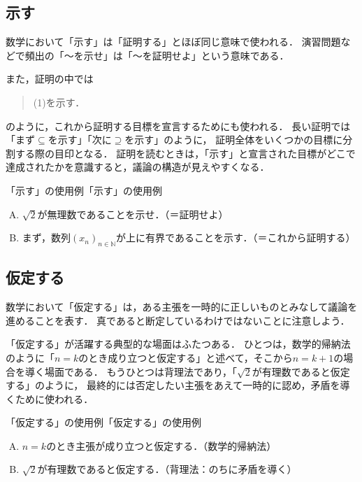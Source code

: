 \subsection{示す}

数学において「示す」は「証明する」とほぼ同じ意味で使われる．
演習問題などで頻出の「〜を示せ」は「〜を証明せよ」という意味である．

また，証明の中では
\begin{quote}
  (1)を示す．
\end{quote}
のように，これから証明する目標を宣言するためにも使われる．
長い証明では「まず$\subseteq$を示す」「次に$\supseteq$を示す」のように，
証明全体をいくつかの目標に分割する際の目印となる．
証明を読むときは，「示す」と宣言された目標がどこで達成されたかを意識すると，議論の構造が見えやすくなる．

\begin{example}{「示す」の使用例}{「示す」の使用例}
  \begin{enumerate}[(A)]
    \item $\sqrt{2}$が無理数であることを示せ．（＝証明せよ）
    \item まず，数列$(x_n)_{n \in \mathbb{N}}$が上に有界であることを示す．（＝これから証明する）
  \end{enumerate}
\end{example}

\subsection{仮定する}

数学において「仮定する」は，ある主張を一時的に正しいものとみなして議論を進めることを表す．
真であると断定しているわけではないことに注意しよう．

「仮定する」が活躍する典型的な場面はふたつある．
ひとつは，数学的帰納法のように「$n=k$のとき成り立つと仮定する」と述べて，そこから$n=k+1$の場合を導く場面である．
もうひとつは背理法であり，「$\sqrt{2}$が有理数であると仮定する」のように，
最終的には否定したい主張をあえて一時的に認め，矛盾を導くために使われる．

\begin{example}{「仮定する」の使用例}{「仮定する」の使用例}
  \begin{enumerate}[(A)]
    \item $n=k$のとき主張が成り立つと仮定する．（数学的帰納法）
    \item $\sqrt{2}$が有理数であると仮定する．（背理法：のちに矛盾を導く）
  \end{enumerate}
\end{example}


